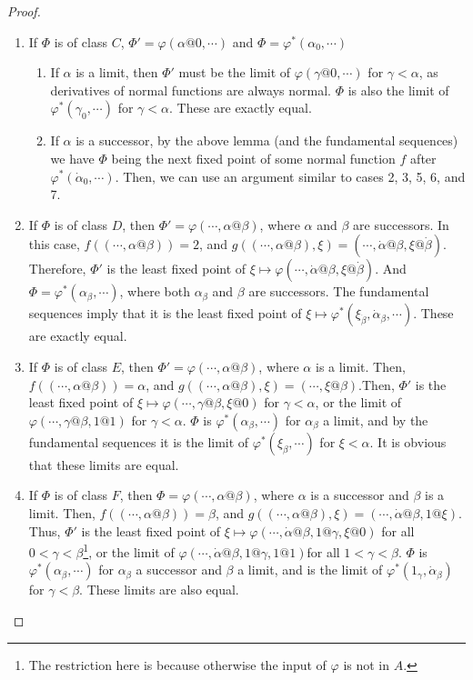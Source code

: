 \documentclass{article}
\theoremstyle{definition}
\theoremstyle{plain}
\theoremstyle{plain}
\theoremstyle{plain}
\theoremstyle{plain}
\theoremstyle{remark}
\theoremstyle{remark}
\theoremstyle{remark}
\theoremstyle{plain}
\theoremstyle{plain}
\begin{document}
\begin{proof}
\begin{enumerate}
    \item If $\Phi$ is of class $C$, $\Phi' = \varphi(\alpha@0, \cdots)$ and $\Phi = \varphi^*(\alpha_0, \cdots)$
    \begin{enumerate}
        \item If $\alpha$ is a limit, then $\Phi'$ must be the limit of $\varphi(\gamma@0, \cdots)$ for $\gamma < \alpha$, as derivatives of normal functions are always normal. $\Phi$ is also the limit of $\varphi^*(\gamma_0, \cdots)$ for $\gamma < \alpha$. These are exactly equal.
        \item If $\alpha$ is a successor, by the above lemma (and the fundamental sequences) we have $\Phi$ being the next fixed point of some normal function $f$ after $\varphi^*(\dot{\alpha}_0, \cdots)$. Then, we can use an argument similar to cases 2, 3, 5, 6, and 7.
    \end{enumerate} 
    \item If $\Phi$ is of class $D$, then $\Phi' = \varphi(\cdots,\alpha@\beta)$, where $\alpha$ and $\beta$ are successors. In this case, $f((\cdots,\alpha@\beta)) = 2$, and $g((\cdots,\alpha@\beta),\xi) = (\cdots,\dot{\alpha}@\beta,\xi@\dot{\beta})$. Therefore, $\Phi'$ is the least fixed point of $\xi \mapsto \varphi(\cdots,\dot{\alpha}@\beta,\xi@\dot{\beta})$. And $\Phi = \varphi^*(\alpha_\beta, \cdots)$, where both $\alpha_\beta$ and $\beta$ are successors. The fundamental sequences imply that it is the least fixed point of $\xi \mapsto \varphi^*(\xi_{\dot{\beta}},\dot{\alpha}_\beta, \cdots)$. These are exactly equal.
    \item If $\Phi$ is of class $E$, then $\Phi' = \varphi(\cdots,\alpha@\beta)$, where $\alpha$ is a limit. Then, $f((\cdots,\alpha@\beta)) = \alpha$, and $g((\cdots,\alpha@\beta),\xi) = (\cdots,\xi@\beta)$.Then, $\Phi'$ is the least fixed point of $\xi\mapsto \varphi(\cdots,\gamma@\beta,\xi@0)$ for $\gamma<\alpha$, or the limit of $\varphi(\cdots,\gamma@\beta, 1@1)$ for $\gamma<\alpha$.
    $\Phi$ is $\varphi^*(\alpha_\beta, \cdots)$ for $\alpha_\beta$ a limit, and by the fundamental sequences it is the limit of $\varphi^*(\xi_\beta, \cdots)$ for $\xi < \alpha$. It is obvious that these limits are equal. 
    \item If $\Phi$ is of class $F$, then $\Phi = \varphi(\cdots,\alpha@\beta)$, where $\alpha$ is a successor and $\beta$ is a limit. Then, $f((\cdots,\alpha@\beta)) = \beta$, and $g((\cdots,\alpha@\beta),\xi) = (\cdots,\dot{\alpha}@\beta,1@\xi)$. Thus, $\Phi'$ is the least fixed point of $\xi\mapsto \varphi(\cdots,\dot{\alpha}@\beta,1@\gamma,\xi@0)$ for all $0<\gamma<\beta$\footnote{The restriction here is because otherwise the input of $\varphi$ is not in $A$.}, or the limit of $\varphi(\cdots,\dot{\alpha}@\beta,1@\gamma,1@1)$\footnotemark[5] for all $1<\gamma<\beta$.  $\Phi$ is $\varphi^*(\alpha_\beta, \cdots)$ for $\alpha_\beta$ a successor and $\beta$ a limit, and is the limit of $\varphi^*(1_\gamma,\dot{\alpha}_\beta)$ for $\gamma<\beta$. These limits are also equal. \qedhere
\end{enumerate}
\end{proof}
\end{document}
